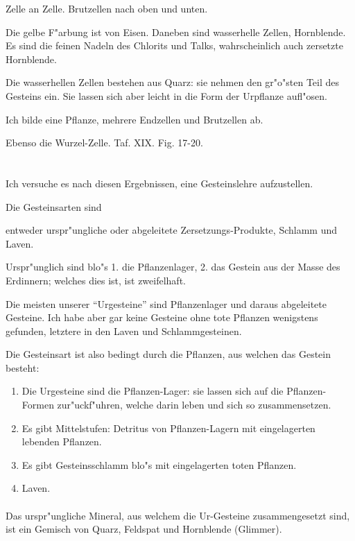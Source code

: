 \documentclass[a4paper, 11pt, oneside, german]{article}
\begin{document}
Zelle an Zelle. Brutzellen nach oben und unten.

Die gelbe F"arbung ist von Eisen. Daneben sind wasserhelle Zellen, Hornblende. Es sind die feinen Nadeln des Chlorits und Talks, wahrscheinlich auch zersetzte Hornblende.

Die wasserhellen Zellen bestehen aus Quarz: sie nehmen den gr"o"sten Teil des Gesteins ein. Sie lassen sich aber leicht in die Form der Urpflanze aufl"osen.

Ich bilde eine Pflanze, mehrere Endzellen und Brutzellen ab.

Ebenso die Wurzel-Zelle. Taf. XIX. Fig. 17-20.
\clearpage
\section{}
\paragraph{}
Ich versuche es nach diesen Ergebnissen, eine Gesteinslehre aufzustellen.

Die Gesteinsarten sind

entweder urspr"ungliche oder abgeleitete Zersetzungs-Produkte, Schlamm und Laven.

Urspr"unglich sind blo"s 1. die Pflanzenlager, 2. das Gestein aus der Masse des Erdinnern; welches dies ist, ist zweifelhaft.

Die meisten unserer "`Urgesteine"' sind Pflanzenlager und daraus abgeleitete Gesteine. Ich habe aber gar keine Gesteine ohne tote Pflanzen wenigstens gefunden, letztere in den Laven und Schlammgesteinen.

Die Gesteinsart ist also bedingt durch die Pflanzen, aus welchen das Gestein besteht:
\begin{enumerate}[label=\Alph*]
\item Die Urgesteine sind die Pflanzen-Lager: sie lassen sich auf die Pflanzen-Formen zur"uckf"uhren, welche darin leben und sich so zusammensetzen.
\item Es gibt Mittelstufen: Detritus von Pflanzen-Lagern mit eingelagerten lebenden Pflanzen.
\item Es gibt Gesteinsschlamm blo"s mit eingelagerten toten Pflanzen.
\item Laven.
\end{enumerate}
\paragraph{}
Das urspr"ungliche Mineral, aus welchem die Ur-Gesteine zusammengesetzt sind, ist ein Gemisch von Quarz, Feldspat und Hornblende (Glimmer).
\end{document}

